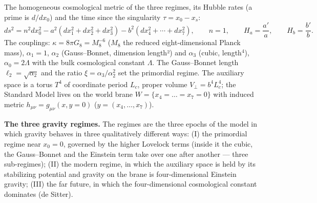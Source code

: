 \documentclass[10pt,a4paper]{article}
\begin{document}
The homogeneous cosmological metric of the three regimes, its Hubble rates (a prime is $d/dx_0$) and the time since the singularity $\tau=x_0-x_s$:
\begin{equation*}
ds^2=n^2dx_0^2-a^2(dx_1^2+dx_2^2+dx_3^2)-b^2(dx_4^2+\cdots+dx_7^2),\qquad n=1,\qquad H_a=\frac{a'}{a},\qquad H_b=\frac{b'}{b}.
\end{equation*}
The couplings: $\kappa=8\pi G_8=M_8^{-6}$ ($M_8$ the reduced eight-dimensional Planck mass), $\alpha_1=1$, $\alpha_2$ (Gauss–Bonnet, dimension length²) and $\alpha_3$ (cubic, length\texorpdfstring{\ensuremath{{}^{4}}}{⁴}), $\alpha_0=2\Lambda$ with the bulk cosmological constant $\Lambda$. The Gauss–Bonnet length $\ell_2=\sqrt{\alpha_2}$ and the ratio $\xi=\alpha_3/\alpha_2^2$ set the primordial regime. The auxiliary space is a torus $T^4$ of coordinate period $L_c$, proper volume $V_\perp=b^4L_c^4$; the Standard Model lives on the world brane $W=\{x_4=\dots=x_7=0\}$ with induced metric $h_{\mu\nu}=g_{\mu\nu}(x,y=0)$ ($y=(x_4,\dots,x_7)$).

\textbf{The three gravity regimes.} The regimes are the three epochs of the model in which gravity behaves in three qualitatively different ways: (I) the primordial regime near $x_0=0$, governed by the higher Lovelock terms (inside it the cubic, the Gauss–Bonnet and the Einstein term take over one after another — three sub-regimes); (II) the modern regime, in which the auxiliary space is held by its stabilizing potential and gravity on the brane is four-dimensional Einstein gravity; (III) the far future, in which the four-dimensional cosmological constant dominates (de Sitter).
\end{document}
